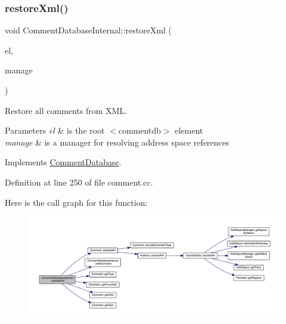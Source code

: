 \subsubsection{\texorpdfstring{restoreXml()}{restoreXml()}}
{\footnotesize\ttfamily void Comment\+Database\+Internal\+::restore\+Xml (\begin{DoxyParamCaption}\item[{const \mbox{\hyperlink{class_element}{Element}} $\ast$}]{el,  }\item[{const \mbox{\hyperlink{class_addr_space_manager}{Addr\+Space\+Manager}} $\ast$}]{manage }\end{DoxyParamCaption})\hspace{0.3cm}{\ttfamily [virtual]}}



Restore all comments from X\+ML. 


\begin{DoxyParams}{Parameters}
{\em el} & is the root $<$commentdb$>$ element \\
\hline
{\em manage} & is a manager for resolving address space references \\
\hline
\end{DoxyParams}


Implements \mbox{\hyperlink{class_comment_database_a21e8b98e7f4276e239f6b2ea59191ded}{Comment\+Database}}.



Definition at line 250 of file comment.\+cc.

Here is the call graph for this function\+:
\nopagebreak
\begin{figure}[H]
\begin{center}
\leavevmode
\includegraphics[width=350pt]{class_comment_database_internal_a461a9fbe7e898e251637bd605d5758e2_cgraph}
\end{center}
\end{figure}
\mbox{\label{class_comment_database_internal_ace5b454d66acbc275e8cf20defc0e242}} 
